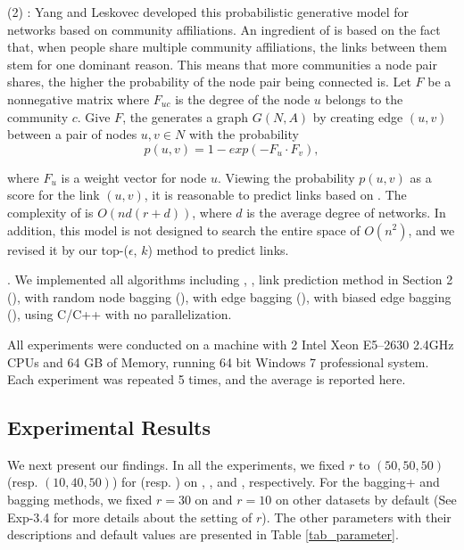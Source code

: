   \noindent (2) \CAMBN \cite{yang-wsdm2013}:
  Yang and Leskovec developed this probabilistic generative model for networks
  based on community affiliations. An ingredient of \BIGCLAM is based on the fact that,
  when people share multiple community affiliations, the links between them stem for
  one dominant reason. This means that more communities a node pair shares,
  the higher the probability of the  node pair being connected is.
  Let $F$ be a nonnegative matrix where $F_{uc}$ is the degree of the node $u$ belongs to
  the community $c$. Give $F$, the \BIGCLAM generates a graph $G(N, A)$ by creating edge
  $(u, v)$ between a pair of nodes $u, v \in N$ with the probability
    \[ p(u, v) = 1 - exp(-F_u\cdot F_v), \]

\noindent  where $F_u$ is a weight vector for node $u$. Viewing the probability $p(u, v)$ as
  a score for the link $(u, v)$, it is reasonable to predict links based on \BIGCLAM.
The complexity of  \BIGCLAM is $O(nd(r + d) )$, where $d$ is the average degree of networks.
  In addition, this model is not designed to search the entire space of $O( n^2 )$,
  and we revised it by our top-($\epsilon$, $k$) method to predict links.


.
We implemented all algorithms including \Aa, \BIGCLAM,
link prediction method in Section 2 (\NMF),
\NMF with random node bagging (\Node), \NMF with  edge bagging (\Edge),
\NMF with biased edge bagging (\Biased),
using C/C++ with no parallelization.


All experiments were conducted on a machine with 2 Intel Xeon
E5--2630 2.4GHz CPUs and 64 GB of Memory, running 64 bit
Windows 7 professional system. Each experiment was repeated 5 times,
and the average is reported here.


\subsection{Experimental Results}


We next present our findings. In all the experiments, we fixed $r$ to
$(50, 50, 50)$ (resp. $(10, 40, 50)$) for \NMF (resp. \BIGCLAM) on
\Digg, \YouTube, and \Wikipedia, respectively. For the bagging+ and bagging
methods, we fixed $r = 30$ on \Digg and $r = 10$ on other datasets by default
(See Exp-3.4 for more details about the setting of $r$).
The other parameters with their descriptions and default values
are presented in Table \ref{tab_parameter}.






